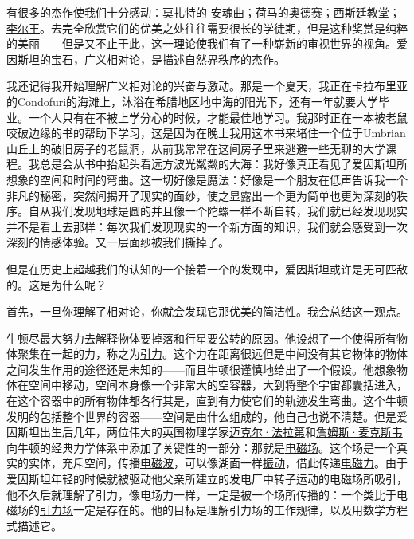     有很多的杰作使我们十分感动：\href{https://en.wikipedia.org/wiki/Wolfgang_Amadeus_Mozart}{莫扎特}的
\href{http://toyhouse.cc/wiki/index.php/安魂曲}{安魂曲}；荷马的\href{http://toyhouse.cc/wiki/index.php/奥德赛}{奥德赛}；\href{http://toyhouse.cc/wiki/index.php/西斯廷教堂}{西斯廷教堂}；\href{http://toyhouse.cc/wiki/index.php/李尔王}{李尔王}。去完全欣赏它们的优美之处往往需要很长的学徒期，但是这种奖赏是纯粹的美丽——但是又不止于此，这一理论使我们有了一种崭新的审视世界的视角。爱因斯坦的宝石，广义相对论，是描述自然界秩序的杰作。

    我还记得我开始理解广义相对论的兴奋与激动。那是一个夏天，我正在卡拉布里亚的Condofuri的海滩上，沐浴在希腊地区地中海的阳光下，还有一年就要大学毕业。一个人只有在不被上学分心的时候，才能最佳地学习。我那时正在一本被老鼠咬破边缘的书的帮助下学习，这是因为在晚上我用这本书来堵住一个位于Umbrian山丘上的破旧房子的老鼠洞，从前我常常在这间房子里来逃避一些无聊的大学课程。我总是会从书中抬起头看远方波光粼粼的大海：我好像真正看见了爱因斯坦所想象的空间和时间的弯曲。这一切好像是魔法：好像是一个朋友在低声告诉我一个非凡的秘密，突然间揭开了现实的面纱，使之显露出一个更为简单也更为深刻的秩序。自从我们发现地球是圆的并且像一个陀螺一样不断自转，我们就已经发现现实并不是看上去那样：每次我们发现现实的一个新方面的知识，我们就会感受到一次深刻的情感体验。又一层面纱被我们撕掉了。

    但是在历史上超越我们的认知的一个接着一个的发现中，爱因斯坦或许是无可匹敌的。这是为什么呢？

    首先，一旦你理解了相对论，你就会发现它那优美的简洁性。我会总结这一观点。

    牛顿尽最大努力去解释物体要掉落和行星要公转的原因。他设想了一个使得所有物体聚集在一起的力，称之为\href{http://toyhouse.cc/wiki/index.php/引力}{引力}。这个力在距离很远但是中间没有其它物体的物体之间发生作用的途径还是未知的——而且牛顿很谨慎地给出了一个假设。他想象物体在空间中移动，空间本身像一个非常大的空容器，大到将整个宇宙都囊括进入，在这个容器中的所有物体都各行其是，直到有力使它们的轨迹发生弯曲。这个牛顿发明的包括整个世界的容器——空间是由什么组成的，他自己也说不清楚。但是爱因斯坦出生后几年，两位伟大的英国物理学家\href{https://en.wikipedia.org/wiki/Michael Faraday}{迈克尔·法拉第}和\href{https://en.wikipedia.org/wiki/James Clerk Maxwell}{詹姆斯·麦克斯韦}向牛顿的经典力学体系中添加了关键性的一部分：那就是\href{http://toyhouse.cc/wiki/index.php/电磁场}{电磁场}。这个场是一个真实的实体，充斥空间，传播\href{http://toyhouse.cc/wiki/index.php/电磁波}{电磁波}，可以像湖面一样\href{http://toyhouse.cc/wiki/index.php/振动}{振动}，借此传递\href{http://toyhouse.cc/wiki/index.php/电磁力}{电磁力}。由于爱因斯坦年轻的时候就被驱动他父亲所建立的发电厂中转子运动的电磁场所吸引，他不久后就理解了引力，像电场力一样，一定是被一个场所传播的：一个类比于电磁场的\href{http://toyhouse.cc/wiki/index.php/引力场}{引力场}一定是存在的。他的目标是理解引力场的工作规律，以及用数学方程式描述它。


